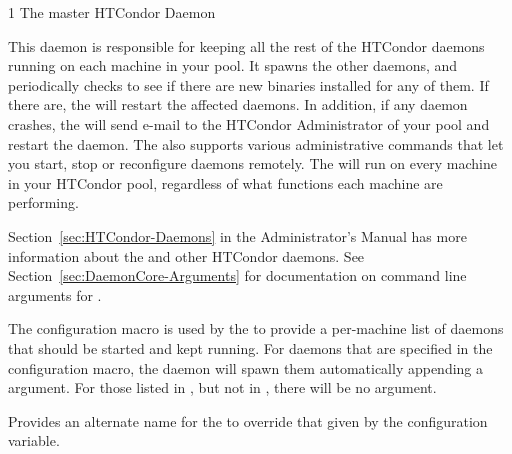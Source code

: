 \begin{ManPage}{\label{man-condor-master}}{1}
{The master HTCondor Daemon}

\Synopsis {}

\Description 

This daemon is responsible for keeping all the
rest of the HTCondor daemons running on each machine in your pool.  It  
spawns the other daemons, and periodically checks to see if there are
new binaries installed for any of them.  If there are,
the  will restart the affected daemons.
In addition, if any daemon crashes, the
 will send e-mail to the HTCondor Administrator of your pool and 
restart the daemon.  The  also supports various
administrative commands that let you start, stop or reconfigure
daemons remotely.  The  will run on every machine in 
your HTCondor pool, regardless of what functions each machine are
performing.

Section~\ref{sec:HTCondor-Daemons} in the Administrator's Manual
has more information
about the  and other HTCondor daemons.
See Section~\ref{sec:DaemonCore-Arguments}
for documentation on
command line arguments for .

The  configuration macro is used by the
 to provide a per-machine list of daemons that
should be started and kept running.
For daemons that are specified in the 
configuration macro,
the  daemon will spawn them automatically
appending a  argument.
For those listed in , but not in ,
there will be no  argument.

\begin{Options}
            {Provides an alternate name for the 
            to override that given by the 
	    configuration variable.
            }
\end{Options}

\end{ManPage}
